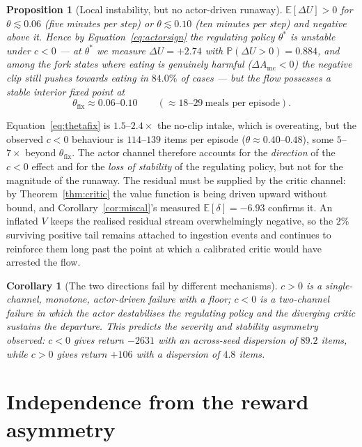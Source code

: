 \documentclass[11pt]{article}
\newtheorem{proposition}[theorem]{Proposition}
\newtheorem{corollary}[theorem]{Corollary}
\theoremstyle{definition}
\newcommand{\E}{\mathbb{E}}
\newcommand{\Prob}{\mathbb{P}}
\begin{document}
\begin{proposition}[Local instability, but no actor-driven runaway]
\label{prop:neg}
$\E[\Delta U]>0$ for $\theta\lesssim0.06$ (five minutes per step) or
$\theta\lesssim0.10$ (ten minutes per step) and \emph{negative} above it.
Hence by Equation~\eqref{eq:actorsign} the regulating policy $\theta^\ast$ is
\emph{unstable} under $c<0$ --- at $\theta^\ast$ we measure
$\Delta U=+2.74$ with $\Prob(\Delta U>0)=0.884$, and among the fork states
where eating is genuinely harmful ($\Delta A_{\mathrm{mc}}<0$) the negative
clip still pushes towards eating in $84.0\%$ of cases --- but the flow
possesses a stable interior fixed point at
\begin{equation}
\theta_{\mathrm{fix}}\approx0.06\text{--}0.10
\qquad(\approx18\text{--}29\ \text{meals per episode}).
\label{eq:thetafix}
\end{equation}
\end{proposition}

\noindent
Equation~\eqref{eq:thetafix} is $1.5$--$2.4\times$ the no-clip intake, which is
overeating, but the observed $c<0$ behaviour is $114$--$139$ items per episode
($\theta\approx0.40$--$0.48$), some $5$--$7\times$ beyond
$\theta_{\mathrm{fix}}$. The actor channel therefore accounts for the
\emph{direction} of the $c<0$ effect and for the \emph{loss of stability} of
the regulating policy, but not for the magnitude of the runaway. The residual
must be supplied by the critic channel: by Theorem~\ref{thm:critic} the value
function is being driven upward without bound, and
Corollary~\ref{cor:miscal}'s measured $\E[\delta]=-6.93$ confirms it. An
inflated $V$ keeps the realised residual stream overwhelmingly negative, so
the $2\%$ surviving positive tail remains attached to ingestion events and
continues to reinforce them long past the point at which a calibrated critic
would have arrested the flow.

\begin{corollary}[The two directions fail by different mechanisms]
\label{cor:asym}
$c>0$ is a single-channel, monotone, actor-driven failure with a floor;
$c<0$ is a two-channel failure in which the actor destabilises the regulating
policy and the diverging critic sustains the departure. This predicts the
severity and stability asymmetry observed: $c<0$ gives return $-2631$ with an
across-seed dispersion of $89.2$ items, while $c>0$ gives return $+106$ with a
dispersion of $4.8$ items.
\end{corollary}

\section{Independence from the reward asymmetry}
\label{sec:notreward}
\end{document}
